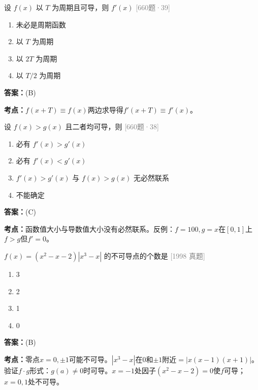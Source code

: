 \documentclass[12pt,a4paper]{ctexbook}
\newcommand{\src}[1]{\hfill\textcolor{gray}{\small\textsf{[#1]}}}
\newcommand{\ans}[1]{\begin{answerbox}\textbf{答案：}#1\end{answerbox}}
\newcommand{\kpt}[1]{\textbf{考点：}#1}
\begin{document}
\bigskip

\begin{exercise}[660题·周期函数的导数·39题]
设 $f(x)$ 以 $T$ 为周期且可导，则 $f'(x)$ \hfill\src{660题·39}
\begin{enumerate}[label=(\Alph*),nosep]
  \item 未必是周期函数
  \item 以 $T$ 为周期
  \item 以 $2T$ 为周期
  \item 以 $T/2$ 为周期
\end{enumerate}
\end{exercise}
\ans{(B)}
\kpt{$f(x+T)\equiv f(x)$两边求导得$f'(x+T)\equiv f'(x)$。}

\bigskip

\begin{exercise}[660题·$f(x)>g(x)$与导数关系·38题]
设 $f(x)>g(x)$ 且二者均可导，则 \hfill\src{660题·38}
\begin{enumerate}[label=(\Alph*),nosep]
  \item 必有 $f'(x)>g'(x)$
  \item 必有 $f'(x)<g'(x)$
  \item $f'(x)>g'(x)$ 与 $f(x)>g(x)$ 无必然联系
  \item 不能确定
\end{enumerate}
\end{exercise}
\ans{(C)}
\kpt{函数值大小与导数值大小没有必然联系。反例：$f=100,g=x$在$[0,1]$上$f>g$但$f'=0$。}

\bigskip

\begin{exercise}
$f(x)=(x^2-x-2)|x^3-x|$ 的不可导点的个数是 \hfill\src{1998 真题}
\begin{enumerate}[label=(\Alph*),nosep]
  \item 3
  \item 2
  \item 1
  \item 0
\end{enumerate}
\end{exercise}
\ans{(B)}
\kpt{零点$x=0,\pm 1$可能不可导。$|x^3-x|$在$0$和$\pm 1$附近$=|x(x-1)(x+1)|$。验证$f\cdot g$形式：$g(a)\neq 0$时可导。$x=-1$处因子$(x^2-x-2)=0$使$f$可导；$x=0,1$处不可导。}

\bigskip
\end{document}
